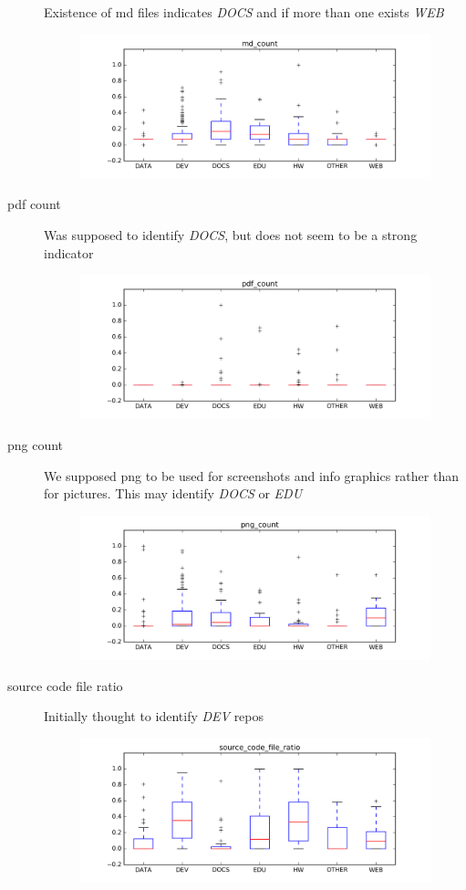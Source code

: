 \documentclass[a4paper]{scrartcl}
\begin{document}
\begin{description}
				Existence of md files indicates \emph{DOCS} and if more than one exists \emph{WEB}
				\begin{figure}[h!]
					\centering
					\includegraphics[width=0.75\linewidth]{figures/md_count.png}
				\end{figure}
			\item[pdf count]
				Was supposed to identify \emph{DOCS}, but does not seem to be a strong indicator
				\begin{figure}[h!]
					\centering
					\includegraphics[width=0.75\linewidth]{figures/pdf_count.png}
				\end{figure}
			\item[png count]
				We supposed png to be used for screenshots and info graphics rather than for pictures. This may identify \emph{DOCS} or \emph{EDU}
				\begin{figure}[h!]
					\centering
					\includegraphics[width=0.75\linewidth]{figures/png_count.png}
				\end{figure}
			\item[source code file ratio]
				Initially thought to identify \emph{DEV} repos
				\begin{figure}[h!]
					\centering
					\includegraphics[width=0.75\linewidth]{figures/source_code_file_ratio.png}
				\end{figure}
		\end{description}
		
\end{document}
